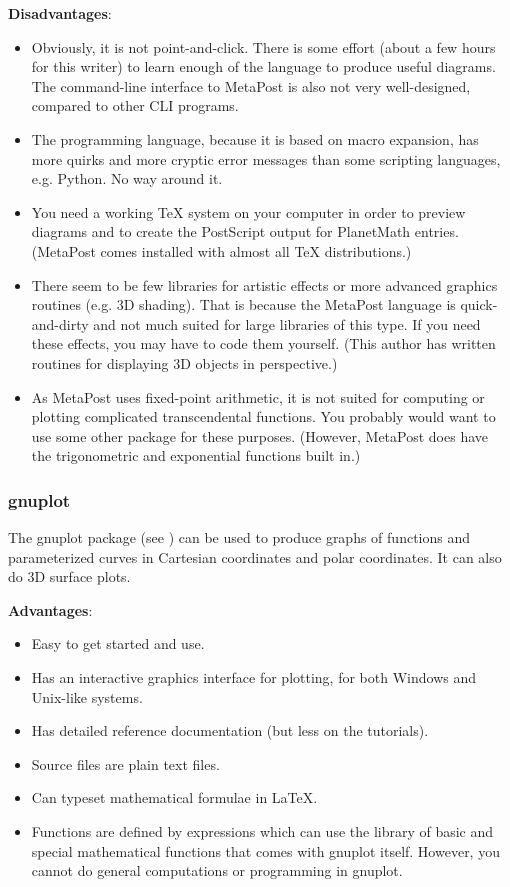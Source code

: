 \textbf{Disadvantages}:
\begin{itemize}
\item
Obviously, it is not point-and-click. There is some effort (about a few hours for this writer) to learn enough of the language to produce useful diagrams. The command-line interface to MetaPost is also not very well-designed, compared to other CLI programs.
\item
The programming language, because it is based on macro expansion, has more quirks and more cryptic error messages than some scripting languages, e.g. Python. No way around it.
\item
You need a working TeX system on your computer in order to preview diagrams
and to create the PostScript output for PlanetMath entries. (MetaPost comes installed with almost all TeX distributions.)
\item
There seem to be few libraries for artistic effects or more advanced graphics routines (e.g. 3D shading). That is because the MetaPost language is quick-and-dirty and not much suited for large libraries of this type. If you need these effects, you may have to code them yourself. (This author has written routines for displaying 3D objects in perspective.)
\item
As MetaPost uses fixed-point arithmetic, it is not suited for computing or plotting complicated transcendental functions. You probably would want to use some other package for these purposes. (However, MetaPost does have the trigonometric and exponential functions built in.)
\end{itemize}

\subsubsection*{gnuplot}

The gnuplot package (see ) can be used to produce graphs of functions and parameterized curves in Cartesian coordinates and polar coordinates. It can also do 3D surface plots.

\textbf{Advantages}:
\begin{itemize}
\item
Easy to get started and use.
\item
Has an interactive graphics interface for plotting, for both Windows and Unix-like systems.
\item
Has detailed reference documentation (but less on the tutorials).
\item
Source files are plain text files.
\item
Can typeset mathematical formulae in LaTeX.
\item
Functions are defined by expressions which can use the library of basic and special mathematical functions that comes with gnuplot itself. However, you cannot do general computations or programming in gnuplot.
\end{itemize}

